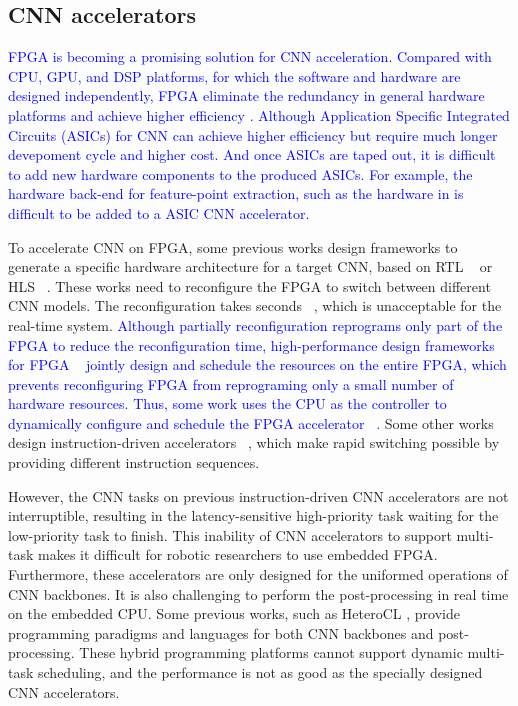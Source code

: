 \subsection{ CNN accelerators }
\textcolor{blue}{
FPGA is becoming a promising solution for CNN acceleration. 
Compared with CPU, GPU, and DSP platforms, for which the software and hardware are designed independently, FPGA eliminate the redundancy in general hardware platforms and achieve higher efficiency \cite{guo2019dl}.
Although Application Specific Integrated Circuits (ASICs) for CNN can achieve higher efficiency but require much longer devepoment cycle and higher cost. And once ASICs are taped out, it is difficult to add new hardware components to the produced ASICs.
For example, the hardware back-end for feature-point extraction, such as the hardware in  is difficult to be added to a ASIC CNN accelerator.
}

To accelerate CNN on FPGA, some previous works design frameworks to generate a specific hardware architecture for a target CNN, based on  RTL  ~\cite{li_high_2016} or HLS  ~\cite{lu_evaluating_2017}. These works need to reconfigure the FPGA to switch between different CNN models. 
The reconfiguration takes seconds  ~\cite{FPGAPerformance}, which is unacceptable for the real-time system. 
\textcolor{blue}{
Although partially reconfiguration reprograms only part of the FPGA to reduce the reconfiguration time, high-performance design frameworks for FPGA ~\cite{li_high_2016,lu_evaluating_2017} jointly design and schedule the resources on the entire FPGA, which prevents reconfiguring FPGA from reprograming only a small number of hardware resources.
Thus, some work uses the CPU as the controller to dynamically configure and schedule the FPGA accelerator ~\cite{meloni2018neuraghe}.
}
Some other works design instruction-driven accelerators  ~\cite{gokhale2017snowflake,yu2018instruction,qiu2016going,guo2017angel,dpu}, which make rapid switching possible by providing different instruction sequences. 

However, the CNN tasks on previous instruction-driven CNN accelerators are not interruptible, resulting in the latency-sensitive high-priority task waiting for the low-priority task to finish. 
This inability of CNN accelerators to support multi-task makes it difficult for robotic researchers to use embedded FPGA. 
Furthermore, these accelerators are only designed for the uniformed operations of CNN backbones. It is also challenging to perform the post-processing in real time on the embedded CPU. 
Some previous works, such as HeteroCL \cite{lai2019heterocl}, provide programming paradigms and languages for both CNN backbones and post-processing. These hybrid programming platforms cannot support dynamic multi-task scheduling, and the performance is not as good as the specially designed CNN accelerators. 

